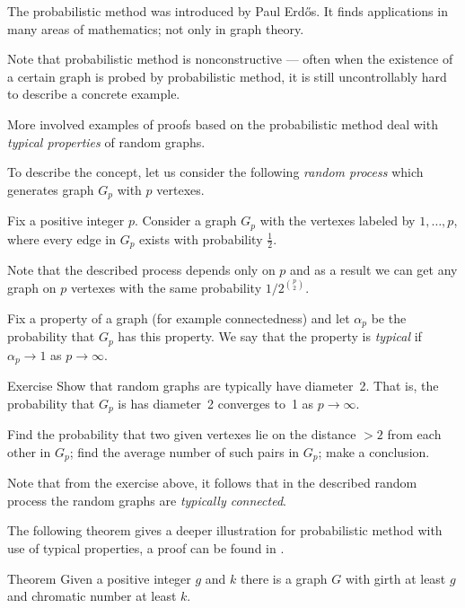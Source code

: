 The probabilistic method was introduced by Paul Erd\H os.
It  finds applications in many areas of mathematics; not only in graph theory.

Note that probabilistic method is nonconstructive ---
often when the existence of a certain graph is probed by probabilistic method,
it is still uncontrollably hard to describe a concrete example.

More involved examples of proofs based on the probabilistic method deal with {}\emph{typical properties} of random graphs.

To describe the concept, let us consider the following {}\emph{random process} which generates graph $G_p$ with $p$ vertexes.

Fix a positive integer $p$. 
Consider a graph $G_p$ with the vertexes labeled by $1,\dots,p$,
where every edge in $G_p$ exists with probability $\tfrac12$.

Note that the described process depends only on $p$ and as a result we can get any graph on $p$ vertexes with the same probability $1/2^{\binom{p}{2}}$.

Fix a property of a graph (for example connectedness)
and let $\alpha_p$ be the probability that $G_p$ has this property.
We say that the property is \emph{typical} if $\alpha_p\to 1$ as $p\to \infty$.

\begin{thm}{Exercise}
Show that random graphs are typically have diameter~2.
That is, the probability that $G_p$ is has diameter~2 converges to~1 as $p\to \infty$.
\end{thm}

 Find the probability that two given vertexes lie on the distance $>2$ from each other in $G_p$; find the average number of such pairs in $G_p$; make a conclusion.

\medskip

Note that from the exercise above, it follows that in the described random process the random graphs are {}\emph{typically connected}.

The following theorem gives a deeper illustration for probabilistic method with use of typical properties,
a proof can be found in \cite[Chapter 44]{aigner-ziegler}.

\begin{thm}{Theorem}
Given a positive integer $g$ and $k$ there is a graph $G$ with girth at least $g$ and chromatic number at least $k$.
\end{thm}
